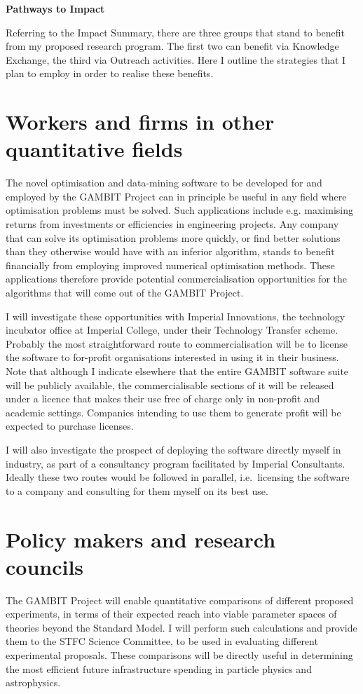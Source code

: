 \documentclass[11pt,oneside,onecolumn,a4paper]{article}
\author{Pat Scott}
\date{}
\begin{document}
\thispagestyle{fancy}

\centerline{\LARGE \textbf{Pathways to Impact}}\bigskip 

Referring to the Impact Summary, there are three groups that stand to benefit from my proposed research program.  The first two can benefit via Knowledge Exchange, the third via Outreach activities.  Here I outline the strategies that I plan to employ in order to realise these benefits.

\section{Workers and firms in other quantitative fields}
The novel optimisation and data-mining software to be developed for and employed by the GAMBIT Project can in principle be useful in any field where optimisation problems must be solved.  Such applications include e.g. maximising returns from investments or efficiencies in engineering projects.  Any company that can solve its optimisation problems more quickly, or find better solutions than they otherwise would have with an inferior algorithm, stands to benefit financially from employing improved numerical optimisation methods.  These applications therefore provide potential commercialisation opportunities for the algorithms that will come out of the GAMBIT Project.  

I will investigate these opportunities with Imperial Innovations, the technology incubator office at Imperial College, under their Technology Transfer scheme.  Probably the most straightforward route to commercialisation will be to license the software to for-profit organisations interested in using it in their business.  Note that although I indicate elsewhere that the entire GAMBIT software suite will be publicly available, the commercialisable sections of it will be released under a licence that makes their use free of charge only in non-profit and academic settings.  Companies intending to use them to generate profit will be expected to purchase licenses.  

I will also investigate the prospect of deploying the software directly myself in industry, as part of a consultancy program facilitated by Imperial Consultants.  Ideally these two routes would be followed in parallel, i.e.\ licensing the software to a company and consulting for them myself on its best use.

\section{Policy makers and research councils}
The GAMBIT Project will enable quantitative comparisons of different proposed experiments, in terms of their expected reach into viable parameter spaces of theories beyond the Standard Model.  I will perform such calculations and provide them to the STFC Science Committee, to be used in evaluating different experimental proposals.  These comparisons will be directly useful in determining the most efficient future infrastructure spending in particle physics and astrophysics.  
\end{document}
